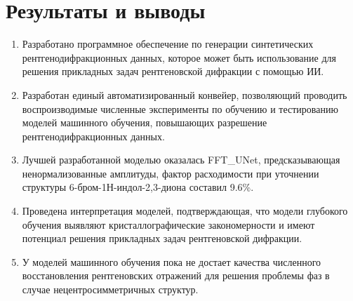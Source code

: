 \section{Результаты и выводы}

\begin{enumerate}
\item Разработано программное обеспечение по генерации синтетических рентгенодифракционных данных, которое может быть использование для решения прикладных задач рентгеновской дифракции с помощью ИИ.%

\item Разработан единый автоматизированный конвейер, позволяющий проводить воспроизводимые численные эксперименты по обучению и тестированию моделей машинного обучения, повышающих разрешение рентгенодифракционных данных.


\item Лучшей разработанной моделью оказалась FFT\_UNet, предсказывающая ненормализованные амплитуды, фактор расходимости при уточнении структуры 6-бром-1Н-индол-2,3-диона составил 9.6\%.


\item Проведена интерпретация моделей, подтверждающая, что модели глубокого обучения выявляют кристаллографические закономерности и имеют потенциал решения прикладных задач рентгеновской дифракции.

\item У моделей машинного обучения пока не достает качества численного восстановления рентгеновских отражений для решения проблемы фаз в случае нецентросимметричных структур.

\end{enumerate}

